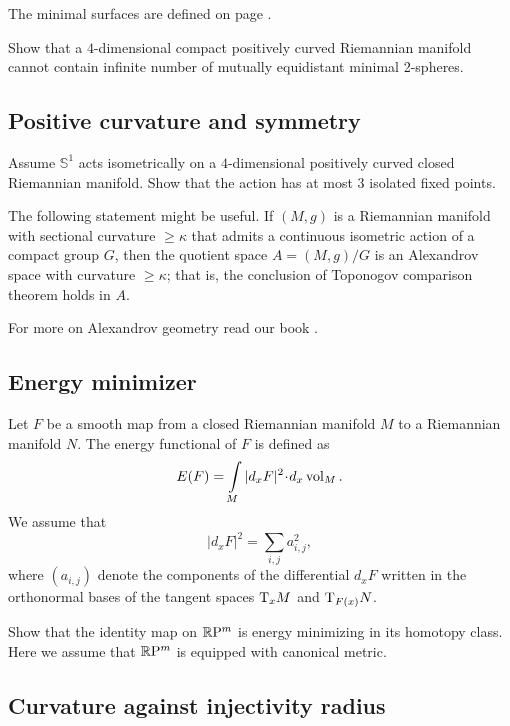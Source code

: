The minimal surfaces are defined on page \pageref{minimal surface}.

\begin{pr}
Show that a 
$4$-dimensional
compact 
positively curved 
Riemannian manifold 
cannot contain infinite number of  mutually
 equidistant minimal 2-spheres.
\end{pr}


\subsection*{Positive curvature and symmetry\thm}
\label{kleiner-hopf} 

\begin{pr}
Assume $\mathbb S^1$ acts isometrically on a $4$-dimensional positively curved closed Riemannian manifold.
Show that the action 
has at most $3$ isolated fixed points.
\end{pr}

The following statement might be useful.
If $(M,g)$ is a Riemannian manifold with sectional curvature $\ge \kappa$ that admits a continuous isometric action of a compact group $G$, 
then the quotient space $A=(M,g)/G$ is an Alexandrov space with curvature $\ge \kappa$;
that is, the conclusion of Toponogov comparison theorem holds in $A$. 

For more on Alexandrov geometry read our book \cite{akp}.

\subsection*{Energy minimizer}
\label{Energy minimizer}

Let $F$ be a smooth map from a closed Riemannian manifold $M$ to a Riemannian manifold $N$.
The energy functional of $F$ is defined as
\[E(F)=\int\limits_M |d_xF|^2\cdot d_x\vol_M.\]
We assume that  
\[|d_xF|^2=\sum_{i,j}a_{i,j}^2,\]
where $(a_{i,j})$ denote the components 
of the differential $d_xF$ 
written in the orthonormal bases of the tangent spaces $\mathrm{T}_xM$ and $\mathrm{T}_{F(x)}N$.

\begin{pr}
Show that the identity map on $\mathbb{R}\mathrm{P}^m$ is 
energy
minimizing in its homotopy class.
Here we assume that $\mathbb{R}\mathrm{P}^m$ is equipped with canonical metric.
\end{pr}


\subsection*{Curvature against injectivity radius\thm}
\label{scalar-curv}

